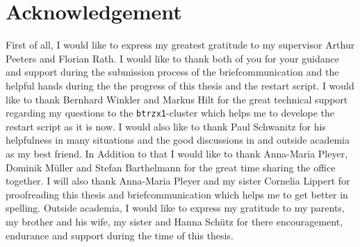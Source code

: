 \chapter*{Acknowledgement}
\label{chap:acknowledgement}

First of all, I would like to express my greatest gratitude to my supervisor Arthur Peeters and Florian Rath. I would like to thank both of you for your guidance and support during the submission process of the briefcommunication and the helpful hands during the the progress of this thesis and the restart script. 
\bigskip
I would like to thank Bernhard Winkler and Markus Hilt for the great technical support regarding my questions to the \texttt{btrzx1}-cluster which helps me to develope the restart script as it is now. 
\bigskip
I would also like to thank Paul Schwanitz for his helpfulness in many situations and the good discussions in and outside academia as my best friend. In Addition to that I would like to thank Anna-Maria Pleyer, Dominik Müller and Stefan Barthelmann for the great time sharing the office together. 
\bigskip
I will also thank Anna-Maria Pleyer and my sister Cornelia Lippert for proofreading this thesis and briefcommunication which helps me to get better in spelling.
\bigskip
Outside academia, I would like to express my gratitude to my parents, my brother and his wife, my sister and Hanna Schütz for there encouragement, endurance and support during the time of this thesis.